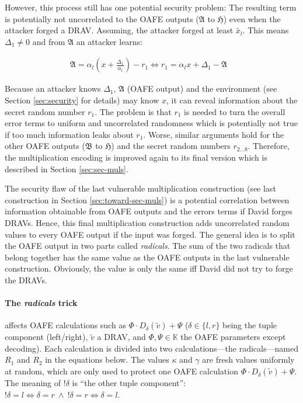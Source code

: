 However, this process still has one potential security problem: The resulting
term is potentially not uncorrelated to the OAFE outputs ($\mathfrak{A}$ to
$\mathfrak{H}$) even when the attacker forged a DRAV\@. Assuming, the attacker
forged at least $\widetilde{x_l}$. This means $\Delta_1 \neq 0$ and from
$\mathfrak{A}$ an attacker learns:

\begin{align*}
  \mathfrak{A} = \alpha_l \left(x+\frac{\Delta_1}{\alpha_l}\right) - r_1
  \Leftrightarrow r_1 = \alpha_l x + \Delta_1 - \mathfrak{A} &
\end{align*}

\noindent{}Because an attacker knows $\Delta_1$, $\mathfrak{A}$ (OAFE output)
and the environment (see Section \ref{sec:security} for details) may know $x$,
it can reveal information about the secret random number $r_1$. The problem is
that $r_1$ is needed to turn the overall error terms to uniform and uncorrelated
randomness which is potentially not true if too much information leaks about
$r_1$. Worse, similar arguments hold for the other OAFE outputs ($\mathfrak{B}$
to $\mathfrak{H}$) and the secret random numbers $r_{2 \ldots 8}$.
Therefore, the multiplication encoding is improved again to its final version
which is described in Section \ref{sec:sec-muls}.


\label{sec:sec-muls}

The security flaw of the last vulnerable multiplication construction (see last
construction in Section \ref{sec:toward-sec-muls}) is a potential correlation
between information obtainable from OAFE outputs and the errors terms if David
forges DRAVs. Hence, this final multiplication construction adds uncorrelated
random values to every OAFE output if the input was forged. The general idea
is to split the OAFE output in two parts called \emph{radicals}. The sum of the
two radicals that belong together has the same value as the OAFE outputs in the
last vulnerable construction.  Obviously, the value is only the same iff David
did not try to forge the DRAVs.

\paragraph{The \emph{radicals} trick} affects OAFE calculations such as $\Phi
\cdot D_\delta(\widetilde{v}) + \Psi$ ($\delta \in \{l, r\}$ being the tuple
component (left/right), $\widetilde{v}$ a DRAV, and $\Phi, \Psi \in \mathbb{K}$
the OAFE parameters except decoding). Each calculation is divided into two
calculations---the radicals---named $R_1$ and $R_2$ in the equations below.
The values $\kappa$ and $\gamma$ are fresh values uniformly at random, which are
only used to protect one OAFE calculation $\Phi \cdot D_\delta(\widetilde{v}) +
\Psi$. The meaning of $!\delta$ is ``the other tuple component'': $!\delta = l
\Leftrightarrow \delta = r~\wedge~!\delta = r \Leftrightarrow \delta = l$.

